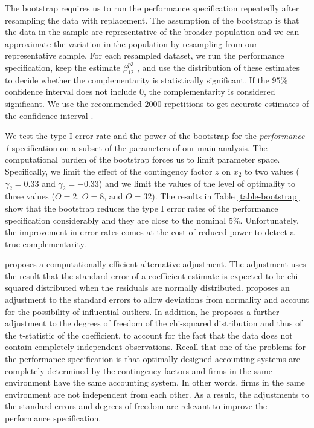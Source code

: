 \documentclass[12pt]{article}
\begin{document}
The bootstrap requires us to run the performance specification repeatedly after resampling the data with replacement. The assumption of the bootstrap is that the data in the sample are representative of the broader population and we can approximate the variation in the population by resampling from our representative sample. For each resampled dataset, we run the performance specification, keep the estimate $\beta_{12}^{p3}$ , and use the distribution of these estimates to decide whether the complementarity is statistically significant. If the $95\%$ confidence interval does not include $0$, the complementarity is considered significant. We use the recommended $2000$ repetitions to get accurate estimates of the confidence interval \citep{efron_computer_2017}. 

We test the type I error rate and the power of the bootstrap for the \emph{performance 1} specification on a subset of the parameters of our main analysis. The computational burden of the bootstrap forces us to limit parameter space. Specifically, we limit the effect of the contingency factor $z$ on $x_2$ to two values ($\gamma_2 = 0.33$ and $\gamma_2 = -0.33$) and we limit the values of the level of optimality to three values ($O=2$, $O=8$, and $O=32$). The results in Table \ref{table-bootstrap} show that the bootstrap reduces the type I error rates of the performance specification considerably and they are close to the nominal $5\%$.  Unfortunately, the improvement in error rates comes at the cost of reduced power to detect a true complementarity.



\citet{young_improved_2016} proposes a computationally efficient alternative adjustment. The adjustment uses the result that the standard error of a coefficient estimate is expected to be chi-squared distributed when the residuals are normally distributed. \cite{young_improved_2016} proposes an adjustment to the standard errors to allow deviations from normality and account for the possibility of influential outliers. In addition, he proposes a further adjustment to the degrees of freedom of the chi-squared distribution and thus of the t-statistic of the coefficient, to account for the fact that the data does not contain completely independent observations. Recall that one of the problems for the performance specification is that optimally designed accounting systems are completely determined by the contingency factors and firms in the same environment have the same accounting system. In other words, firms in the same environment are not independent from each other. As a result, the adjustments to the standard errors and degrees of freedom are relevant to improve the performance specification.
\end{document}
